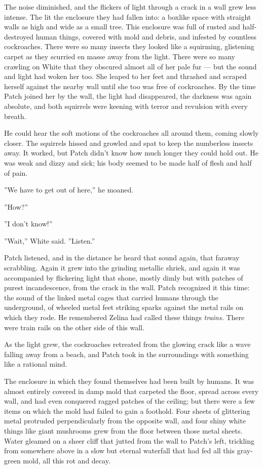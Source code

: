 \documentclass[12pt]{book}
\begin{document}
The noise diminished, and the flickers of light through a crack in a wall grew less intense. The lit the enclosure they had fallen into: a boxlike space with straight walls as high and wide as a small tree. This enclosure was full of rusted and half-destroyed human things, covered with mold and debris, and infested by countless cockroaches. There were so many insects they looked like a squirming, glistening carpet as they scurried en masse away from the light. There were so many crawling on White that they obscured almost all of her pale fur ---
but the sound and light had woken her too. She leaped to her feet and thrashed and scraped herself against the nearby wall until she too was free of cockroaches. By the time Patch joined her by the wall, the light had disappeared, the darkness was again absolute, and both squirrels were keening with terror and revulsion with every breath.

He could hear the soft motions of the cockroaches all around them, coming slowly closer. The squirrels hissed and growled and spat to keep the numberless insects away. It worked, but Patch didn't know how much longer they could hold out. He was weak and dizzy and sick; his body seemed to be made half of flesh and half of pain.

''We have to get out of here,'' he moaned.

''How?''

''I don't know!''

''Wait,'' White said. ''Listen.''

Patch listened, and in the distance he heard that sound again, that faraway scrabbling. Again it grew into the grinding metallic shriek, and again it was accompanied by flickering light that shone, mostly dimly but with patches of purest incandescence, from the crack in the wall. Patch recognized it this time: the sound of the linked metal cages that carried humans through the underground, of wheeled metal feet striking sparks against the metal rails on which they rode. He remembered Zelina had called these things {\it trains.} There were train rails on the other side of this wall.

As the light grew, the cockroaches retreated from the glowing crack like a wave falling away from a beach, and Patch took in the surroundings with something like a rational mind.

The enclosure in which they found themselves had been built by humans. It was almost entirely covered in damp mold that carpeted the floor, spread across every wall, and had even conquered ragged patches of the ceiling; but there were a few items on which the mold had failed to gain a foothold. Four sheets of glittering metal protruded perpendicularly from the opposite wall, and four shiny white things like giant mushrooms grew from the floor between those metal sheets. Water gleamed on a sheer cliff that jutted from the wall to Patch's left, trickling from somewhere above in a slow but eternal waterfall that had fed all this gray-green mold, all this rot and decay.
\end{document}
